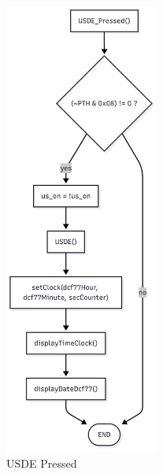 \documentclass[a4paper,12pt]{article}
\begin{document}
\begin{figure}[H]
    \centering
    \includegraphics[width=0.45\textwidth]{diagrams/9.USDE_Pressed.png}
    \caption{USDE Pressed}
    \label{fig:USDEPressed}
\end{figure}
\end{document}
